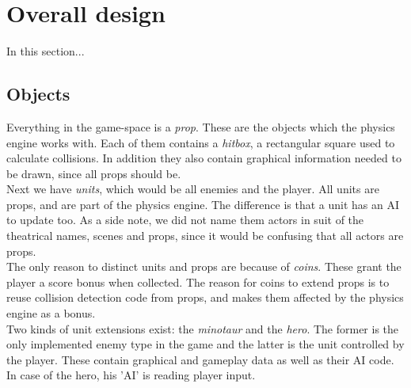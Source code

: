 \chapter{Overall design}
In this section...\\

\section{Objects} %
Everything in the game-space is a \emph{prop}. These are the objects which the physics engine works with. Each of them contains a \emph{hitbox}, a rectangular square used to calculate collisions. In addition they also contain graphical information needed to be drawn, since all props should be.\\
Next we have \emph{units}, which would be all enemies and the player. All units are props, and are part of the physics engine. The difference is that a unit has an AI to update too. As a side note, we did not name them actors in suit of the theatrical names, scenes and props, since it would be confusing that all actors are props.\\
The only reason to distinct units and props are because of \emph{coins}. These grant the player a score bonus when collected. The reason for coins to extend props is to reuse collision detection code from props, and makes them affected by the physics engine as a bonus.\\
Two kinds of unit extensions exist: the \emph{minotaur} and the \emph{hero}. The former is the only implemented enemy type in the game and the latter is the unit controlled by the player. These contain graphical and gameplay data as well as their AI code. In case of the hero, his 'AI' is reading player input.

